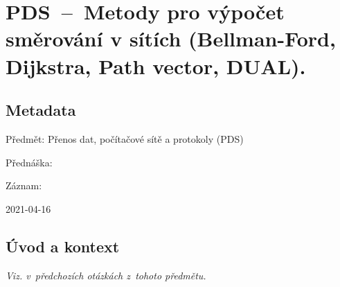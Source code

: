

\graphicspath{{pds/teorie_smerovani/figures}}


\chapter{PDS~--~Metody pro výpočet směrování v sítích (Bellman-Ford, Dijkstra, Path vector, DUAL).}



\section{Metadata}

\begin{compactitem}
    \item Předmět: Přenos dat, počítačové sítě a protokoly (PDS)
    \item Přednáška:
    \begin{compactitem}
        \item {}
    \end{compactitem}
    \item Záznam:
    \begin{compactitem}
        \item 2021-04-16
    \end{compactitem}
\end{compactitem}


\section{Úvod a kontext}

\textit{Viz.  v~předchozích otázkách z~tohoto předmětu.}

